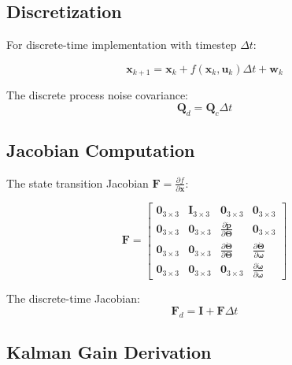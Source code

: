 \subsection{Discretization}

For discrete-time implementation with timestep $\Delta t$:

\begin{equation}
    \mathbf{x}_{k+1} = \mathbf{x}_k + f(\mathbf{x}_k, \mathbf{u}_k) \Delta t + \mathbf{w}_k
\end{equation}

The discrete process noise covariance:
\begin{equation}
    \mathbf{Q}_d = \mathbf{Q}_c \Delta t
\end{equation}

\subsection{Jacobian Computation}

The state transition Jacobian $\mathbf{F} = \frac{\partial f}{\partial \mathbf{x}}$:

\begin{equation}
    \mathbf{F} = \begin{bmatrix}
        \mathbf{0}_{3\times3} & \mathbf{I}_{3\times3} & \mathbf{0}_{3\times3} & \mathbf{0}_{3\times3} \\
        \mathbf{0}_{3\times3} & \mathbf{0}_{3\times3} & \frac{\partial \ddot{\mathbf{p}}}{\partial \boldsymbol{\Theta}} & \mathbf{0}_{3\times3} \\
        \mathbf{0}_{3\times3} & \mathbf{0}_{3\times3} & \frac{\partial \dot{\boldsymbol{\Theta}}}{\partial \boldsymbol{\Theta}} & \frac{\partial \dot{\boldsymbol{\Theta}}}{\partial \boldsymbol{\omega}} \\
        \mathbf{0}_{3\times3} & \mathbf{0}_{3\times3} & \mathbf{0}_{3\times3} & \frac{\partial \dot{\boldsymbol{\omega}}}{\partial \boldsymbol{\omega}}
    \end{bmatrix}
\end{equation}

The discrete-time Jacobian:
\begin{equation}
    \mathbf{F}_d = \mathbf{I} + \mathbf{F} \Delta t
\end{equation}

\subsection{Kalman Gain Derivation}

